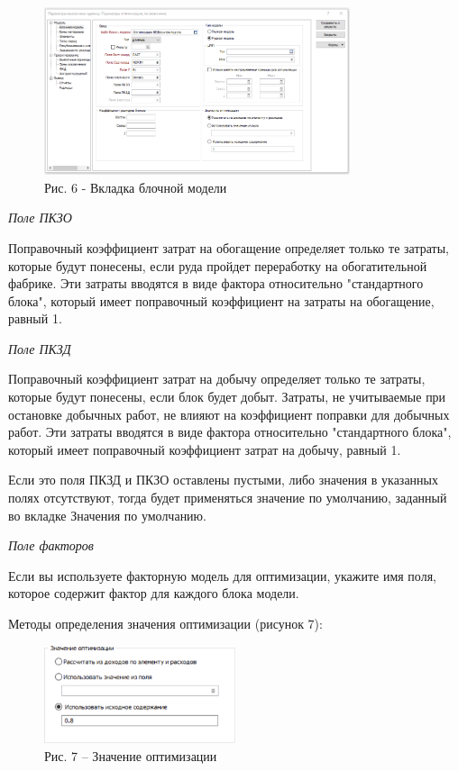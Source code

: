 \begin{figure}[H]
	\centering
	\includegraphics[width=0.8\textwidth]{assets/1255}
	\caption*{Рис. 6 - Вкладка блочной модели}
\end{figure}

\begin{multicols}{2}
\emph{Поле ПКЗО}

Поправочный коэффициент затрат на обогащение определяет только те
затраты, которые будут понесены, если руда пройдет переработку на
обогатительной фабрике. Эти затраты вводятся в виде фактора относительно
"стандартного блока", который имеет поправочный коэффициент на затраты
на обогащение, равный 1.

\emph{Поле ПКЗД}

Поправочный коэффициент затрат на добычу определяет только те затраты,
которые будут понесены, если блок будет добыт. Затраты, не учитываемые
при остановке добычных работ, не влияют на коэффициент поправки для
добычных работ. Эти затраты вводятся в виде фактора относительно
"стандартного блока", который имеет поправочный коэффициент затрат на
добычу, равный 1.

Если это поля ПКЗД и ПКЗО оставлены пустыми, либо значения в указанных
полях отсутствуют, тогда будет применяться значение по умолчанию,
заданный во вкладке Значения по умолчанию.

\emph{Поле факторов}

Если вы используете факторную модель для оптимизации, укажите имя поля,
которое содержит фактор для каждого блока модели.

Методы определения значения оптимизации (рисунок 7):
\end{multicols}

\begin{figure}[H]
	\centering
	\includegraphics[width=0.5\textwidth]{assets/1256}
	\caption*{Рис. 7 -- Значение оптимизации}
\end{figure}

